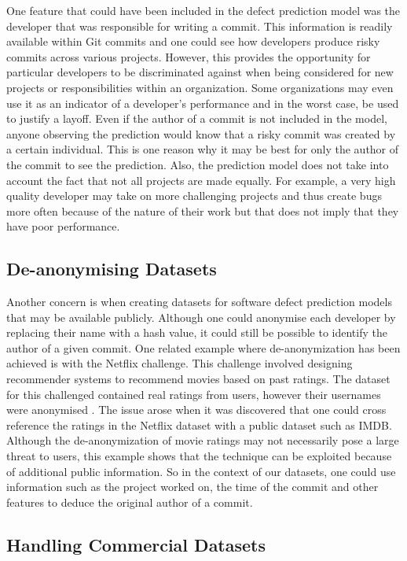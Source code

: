 \documentclass[../main.tex]{subfiles}
\begin{document}
One feature that could have been included in the defect prediction model was the developer that was responsible for writing a commit. This information is readily available within Git commits and one could see how developers produce risky commits across various projects. However, this provides the opportunity for particular developers to be discriminated against when being considered for new projects or responsibilities within an organization. Some organizations may even use it as an indicator of a developer's performance and in the worst case, be used to justify a layoff. Even if the author of a commit is not included in the model, anyone observing the prediction would know that a risky commit was created by a certain individual. This is one reason why it may be best for only the author of the commit to see the prediction. Also, the prediction model does not take into account the fact that not all projects are made equally. For example, a very high quality developer may take on more challenging projects and thus create bugs more often because of the nature of their work but that does not imply that they have poor performance. 

\subsection{De-anonymising Datasets}

Another concern is when creating datasets for software defect prediction models that may be available publicly. Although one could anonymise each developer by replacing their name with a hash value, it could still be possible to identify the author of a given commit. One related example where de-anonymization has been achieved is with the Netflix challenge. This challenge involved designing recommender systems to recommend movies based on past ratings. The dataset for this challenged contained real ratings from users, however their usernames were anonymised \cite{naranyanan2008robust}. The issue arose when it was discovered that one could cross reference the ratings in the Netflix dataset with a public dataset such as IMDB. Although the de-anonymization of movie ratings may not necessarily pose a large threat to users, this example shows that the technique can be exploited because of additional public information. So in the context of our datasets, one could use information such as the project worked on, the time of the commit and other features to deduce the original author of a commit.

\subsection{Handling Commercial Datasets}
\end{document}
